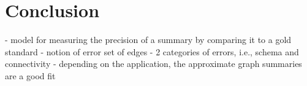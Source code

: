 \section{Conclusion}

- model for measuring the precision of a summary by comparing it to a gold standard
- notion of error set of edges
- 2 categories of errors, i.e., schema and connectivity
- depending on the application, the approximate graph summaries are a good fit
